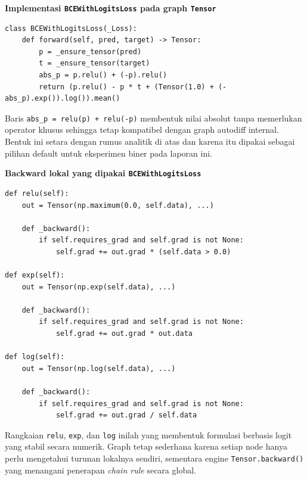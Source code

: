 \documentclass{article}
\begin{document}
\noindent\textbf{Implementasi \texttt{BCEWithLogitsLoss} pada graph \texttt{Tensor}}\par
\begin{lstlisting}
class BCEWithLogitsLoss(_Loss):
    def forward(self, pred, target) -> Tensor:
        p = _ensure_tensor(pred)
        t = _ensure_tensor(target)
        abs_p = p.relu() + (-p).relu()
        return (p.relu() - p * t + (Tensor(1.0) + (-abs_p).exp()).log()).mean()
\end{lstlisting}
Baris \texttt{abs\_p = relu(p) + relu(-p)} membentuk nilai absolut tanpa memerlukan operator khusus sehingga tetap kompatibel dengan graph autodiff internal. Bentuk ini setara dengan rumus analitik di atas dan karena itu dipakai sebagai pilihan default untuk eksperimen biner pada laporan ini.

\noindent\textbf{Backward lokal yang dipakai \texttt{BCEWithLogitsLoss}}\par
\begin{lstlisting}
def relu(self):
    out = Tensor(np.maximum(0.0, self.data), ...)

    def _backward():
        if self.requires_grad and self.grad is not None:
            self.grad += out.grad * (self.data > 0.0)

def exp(self):
    out = Tensor(np.exp(self.data), ...)

    def _backward():
        if self.requires_grad and self.grad is not None:
            self.grad += out.grad * out.data

def log(self):
    out = Tensor(np.log(self.data), ...)

    def _backward():
        if self.requires_grad and self.grad is not None:
            self.grad += out.grad / self.data
\end{lstlisting}
Rangkaian \texttt{relu}, \texttt{exp}, dan \texttt{log} inilah yang membentuk formulasi berbasis logit yang stabil secara numerik. Graph tetap sederhana karena setiap node hanya perlu mengetahui turunan lokalnya sendiri, sementara engine \texttt{Tensor.backward()} yang menangani penerapan \textit{chain rule} secara global.
\end{document}
